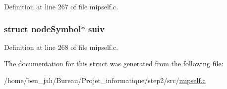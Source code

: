 \-Definition at line 267 of file mipself.\-c.

\hypertarget{structnode_symbol_a87372660f96867008855af85c4057b7c}{
\subsubsection[{suiv}]{\setlength{\rightskip}{0pt plus 5cm}struct {\bf node\-Symbol}$\ast$ {\bf suiv}}}\label{structnode_symbol_a87372660f96867008855af85c4057b7c}


\-Definition at line 268 of file mipself.\-c.



\-The documentation for this struct was generated from the following file\-:\begin{DoxyCompactItemize}
\item 
/home/ben\-\_\-jah/\-Bureau/\-Projet\-\_\-informatique/step2/src/\hyperlink{mipself_8c}{mipself.\-c}\end{DoxyCompactItemize}
